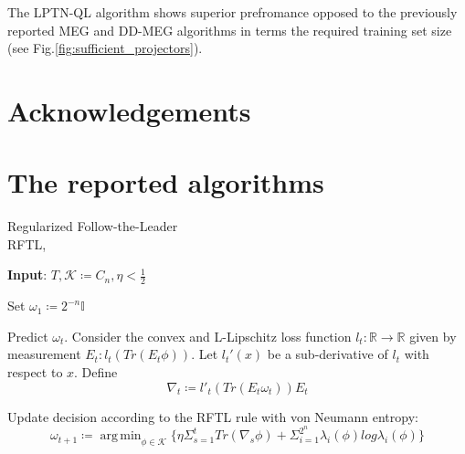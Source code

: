 \documentclass[%
 reprint,
 amsmath,amssymb,
 aps,
]{revtex4-2}
\DeclareMathOperator*{\argmin}{arg\,min}
\begin{document}
The LPTN-QL algorithm shows superior prefromance opposed to the previously reported MEG and DD-MEG algorithms in terms the required training set size (see Fig.\ref{fig:sufficient_projectors}). 


\section{\label{sec:acknowledge}Acknowledgements}


\appendix

\section{The reported algorithms}
\label{sec:app_algos}

\begin{algorithm}
\caption{Regularized Follow-the-Leader\\ RFTL,~\cite{rftl}}
\hspace*{\algorithmicindent} \textbf{Input}: $T,\mathcal{K}\coloneqq C_n,\eta < \frac{1}{2}$ \\
\begin{algorithmic}[1]
\State Set $\omega_1\coloneqq 2^{-n}\mathbb{I}$

    \State  Predict $\omega_t$. Consider the convex and L-Lipschitz loss function $l_t : \mathbb{R} \rightarrow \mathbb{R}$ given by measurement $E_t : l_t(Tr(E_t\phi))$. Let $l_t'(x)$ be a sub-derivative of $l_t$ with respect to $x$. Define
    $$\nabla_t\coloneqq l'_t(Tr(E_t\omega_t))E_t$$

\State Update decision according to the RFTL rule with von Neumann entropy:
\begin{equation}
\label{eq:rftl}
  \omega_{t+1}\coloneqq\argmin_{\phi\in\mathcal{K}}{\big\{ \eta\Sigma_{s=1}^tTr(\nabla_s\phi)+\Sigma_{i=1}^{2^n}\lambda_i(\phi)log\lambda_i(\phi) \big\}}  
\end{equation}

\EndFor

\end{algorithmic}
\label{algo:rftl}
\end{algorithm}
\end{document}
